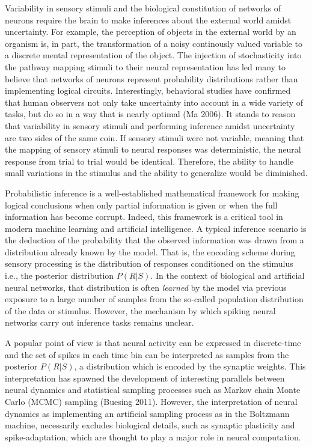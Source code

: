 \documentclass{ucetd}
\begin{document}
Variability in sensory stimuli and the biological constitution of networks of neurons require the brain to make inferences about the external world amidst uncertainty. For example, the perception of objects in the external world by an organism is, in part, the transformation of a noisy continously valued variable to a discrete mental representation of the object. The injection of stochasticity into the pathway mapping stimuli to their neural representation has led many to believe that networks of neurons represent probability distributions rather than implementing logical circuits. Interestingly, behavioral studies have confirmed that human observers not only take uncertainty into account in a wide variety of tasks, but do so in a way that is nearly optimal (Ma 2006). It stands to reason that variability in sensory stimuli and performing inference amidst uncertainty are two sides of the same coin. If sensory stimuli were not variable, meaning that the mapping of sensory stimuli to neural responses was deterministic, the neural response from trial to trial would be identical. Therefore, the ability to handle small variations in the stimulus and the ability to generalize would be diminished.

Probabilistic inference is a well-established mathematical framework for making logical conclusions when only partial information is given or when the full information has become corrupt. Indeed, this framework is a critical tool in modern machine learning and artificial intelligence. A typical inference scenario is the deduction of the probability that the observed information was drawn from a distribution already known by the model. That is, the encoding scheme during sensory processing is the distribution of responses conditioned on the stimulus i.e., the posterior distribution $P(R|S)$. In the context of biological and artificial neural networks, that distribution is often \emph{learned} by the model via previous exposure to a large number of samples from the so-called population distribution of the data or stimulus. However, the mechanism by which spiking neural networks carry out inference tasks remains unclear. 

A popular point of view is that neural activity can be expressed in discrete-time and the set of spikes in each time bin can be interpreted as samples from the posterior $P(R|S)$, a distribution which is encoded by the synaptic weights. This interpretation has spawned the development of interesting parallels between neural dynamics and statistical sampling processes such as Markov chain Monte Carlo (MCMC) sampling (Buesing 2011). However, the interpretation of neural dynamics as implementing an artificial sampling process as in the Boltzmann machine, necessarily excludes biological details, such as synaptic plasticity and spike-adaptation, which are thought to play a major role in neural computation.
\end{document}
